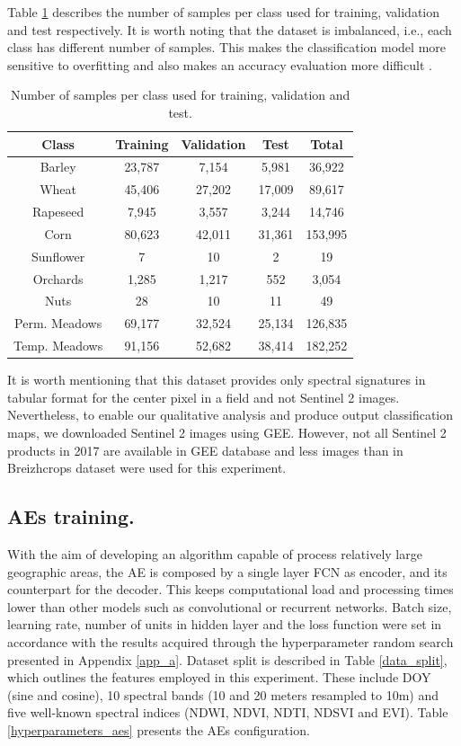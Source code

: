 \documentclass[journal,article,submit,pdftex,moreauthors]{Definitions/mdpi}
\begin{document}
Table \ref{samples} describes the number of samples per class used for training, validation and test respectively.
It is worth noting that the dataset is imbalanced, i.e., each class has different number of samples. This makes the classification model more sensitive to overfitting and also makes an accuracy evaluation more difficult \cite{Foody2002}.

\begin{table}[H]
	\centering
	\caption{Number of samples per class used for training, validation and test.}
	\small
	\begin{tabular}{c c c c c}
		\hline
		Class			& Training		& Validation 	& Test 		& Total \\
		\hline
		Barley			& 23,787		& 7,154			& 5,981		& 36,922 \\
		Wheat			& 45,406		& 27,202		& 17,009	& 89,617 \\
		Rapeseed		& 7,945			& 3,557			& 3,244		& 14,746 \\
		Corn			& 80,623		& 42,011		& 31,361	& 153,995 \\
		Sunflower		& 7				& 10			& 2			& 19 \\
		Orchards		& 1,285			& 1,217			& 552		& 3,054 \\
		Nuts			& 28			& 10			& 11		& 49 \\
		Perm. Meadows	& 69,177		& 32,524		& 25,134	& 126,835 \\
		Temp. Meadows	& 91,156		& 52,682		& 38,414	& 182,252 \\
		\hline
	\end{tabular}
	\label{samples}
\end{table}
It is worth mentioning that this dataset provides only spectral signatures in tabular format for the center pixel in a field and not Sentinel 2 images. Nevertheless, to enable our qualitative analysis and produce output classification maps, we downloaded Sentinel 2 images using GEE. However, not all Sentinel 2 products in 2017 are available in GEE database and less images than in Breizhcrops dataset were used for this experiment.
\subsection{\ac{AEs} training.}
With the aim of developing an algorithm capable of process relatively large geographic areas, the AE is composed by a single layer \ac{FCN} as encoder, and its counterpart for the decoder.
This keeps computational load and processing times lower than other models such as convolutional or recurrent networks.
Batch size, learning rate, number of units in hidden layer and the loss function were set in accordance with the results acquired through the hyperparameter random search presented in Appendix \ref{app_a}.
Dataset split is described in Table \ref{data_split}, which outlines the features employed in this experiment. These include \ac{DOY} (sine and cosine), 10 spectral bands (10 and 20 meters resampled to 10m) and five well-known spectral indices (\ac{NDWI}, \ac{NDVI}, \ac{NDTI}, \ac{NDSVI} and \ac{EVI}). Table \ref{hyperparameters_aes} presents the \ac{AEs} configuration.
\end{document}
